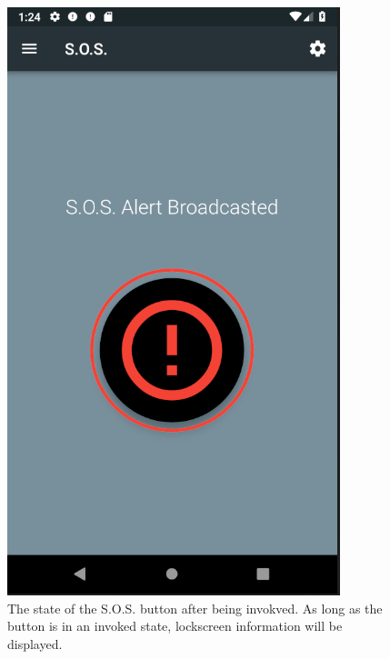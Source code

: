 \documentclass[10pt, a4paper]{article}
\begin{document}
\begin{figure}[H]
  \includegraphics[width=\linewidth]{img/broadcasted.png}
  \caption{The state of the S.O.S. button after being invokved. As long as the button is in an invoked state, lockscreen information will be displayed.}
\endminipage
\end{figure}
\end{document}
